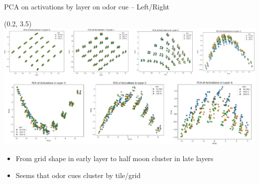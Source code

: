 \documentclass[bigger]{beamer}
\begin{document}
\begin{frame}[label={sec:orgada7815}]{PCA on activations by layer on odor cue -- Left/Right}
\begin{textblock}{15}(0.2, 3.5)%
\includegraphics[height=0.68\textheight, keepaspectratio]{medias/PCA-layers-activations-cue-LeftRight.png}
\vspace{-2em}
\footnotesize
\begin{itemize}
\setlength\itemsep{0em}
\item From grid shape in early layer to half moon cluster in late layers
\item Seems that odor cues cluster by tile/grid
\end{itemize}
\end{textblock}
\end{frame}
\end{document}
